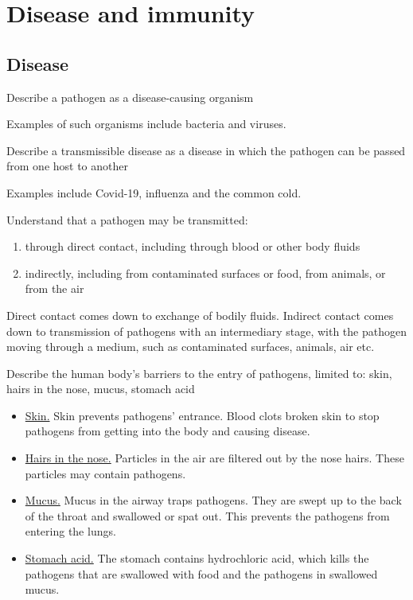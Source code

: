 \section{Disease and immunity}
\subsection{Disease}

\begin{point}
Describe a pathogen as a disease-causing organism
\end{point}

Examples of such organisms include bacteria and viruses.

\begin{point}
Describe a transmissible disease as a disease in which the pathogen can be passed from one host to 
another
\end{point}

Examples include Covid-19, influenza and the common cold.

\begin{point}
Understand that a pathogen may be transmitted: 
\begin{enumerate}[label=(\alph*)]
\setlength\itemsep{0em}
\item through direct contact, including through blood or other body fluids
\item indirectly, including from contaminated surfaces or food, from animals, or from the air
\end{enumerate}
\end{point}

Direct contact comes down to exchange of bodily fluids. Indirect contact comes down to 
transmission of pathogens with an intermediary stage, with the pathogen moving through a medium, 
such as contaminated surfaces, animals, air etc.

\begin{point}
Describe the human body’s barriers to the entry of pathogens, limited to: skin, hairs in the nose, mucus, 
stomach acid
\end{point}

\begin{itemize}
\item\ul{Skin.}
Skin prevents pathogens' entrance. Blood clots broken skin to stop pathogens from getting into the
body and causing disease.

\item\ul{Hairs in the nose.} Particles in the air are filtered out by the nose hairs. These 
particles may contain pathogens.

\item\ul{Mucus.} Mucus in the airway traps pathogens. They are swept up to the back of the throat
and swallowed or spat out. This prevents the pathogens from entering the lungs. 

\item\ul{Stomach acid.} The stomach contains hydrochloric acid, which kills the pathogens that
are swallowed with food and the pathogens in swallowed mucus.
\end{itemize}


